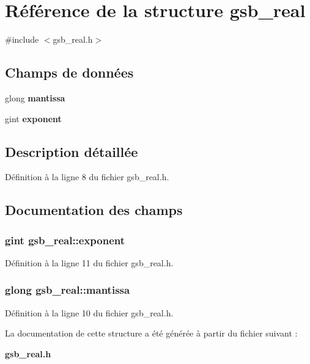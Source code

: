 \section{Référence de la structure gsb\_\-real}
\label{structgsb__real}


{\ttfamily \#include $<$gsb\_\-real.h$>$}

\subsection*{Champs de données}
\begin{DoxyCompactItemize}
\item 
glong {\bf mantissa}
\item 
gint {\bf exponent}
\end{DoxyCompactItemize}


\subsection{Description détaillée}


Définition à la ligne 8 du fichier gsb\_\-real.h.



\subsection{Documentation des champs}
\subsubsection[{exponent}]{\setlength{\rightskip}{0pt plus 5cm}gint {\bf gsb\_\-real::exponent}}\label{structgsb__real_a7456f056c5e05f97c3786eee0cffc047}


Définition à la ligne 11 du fichier gsb\_\-real.h.

\subsubsection[{mantissa}]{\setlength{\rightskip}{0pt plus 5cm}glong {\bf gsb\_\-real::mantissa}}\label{structgsb__real_a00c99ad79aa77fb0af5b5e08f140b3ae}


Définition à la ligne 10 du fichier gsb\_\-real.h.



La documentation de cette structure a été générée à partir du fichier suivant :\begin{DoxyCompactItemize}
\item 
{\bf gsb\_\-real.h}\end{DoxyCompactItemize}
